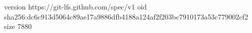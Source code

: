 version https://git-lfs.github.com/spec/v1
oid sha256:dc6c913d5064c89ae17a9886dfb4188a124af2f203bc7910173a53c779002cf2
size 7880
